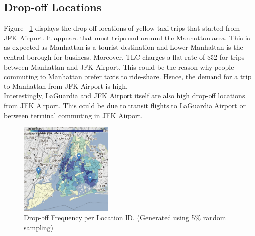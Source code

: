 \documentclass[11pt]{article}
\begin{document}
\subsection{Drop-off Locations}
Figure ~\ref{fig:geo} displays the drop-off locations of yellow taxi trips that started from JFK Airport. It appears that most trips end around the Manhattan area. This is as expected as Manhattan is a tourist destination and Lower Manhattan is the central borough for business. Moreover, TLC charges a flat rate of \$52 for trips between Manhattan and JFK Airport. This could be the reason why people commuting to Manhattan prefer taxis to ride-share. Hence, the demand for a trip to Manhattan from JFK Airport is high.
\\
Interestingly, LaGuardia and JFK Airport itself are also high drop-off locations from JFK Airport. This could be due to transit flights to LaGuardia Airport or between terminal commuting in JFK Airport.
\begin{figure}[h]
    \includegraphics[width=0.4\textwidth]{plots/geospatial_vis.png}
    \centering
    \caption{Drop-off Frequency per Location ID. (Generated using 5\% random sampling) } 
    \label{fig:geo}
\end{figure}
\end{document}
